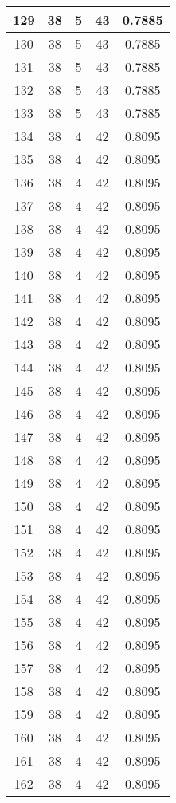 \documentclass[letterpaper, 12pt]{article}
\begin{document}
\begin{longtable}{|c|c|c|c|c|}
\hline
129 & 38 & 5 & 43 & 0.7885 \\
\hline
130 & 38 & 5 & 43 & 0.7885 \\
\hline
131 & 38 & 5 & 43 & 0.7885 \\
\hline
132 & 38 & 5 & 43 & 0.7885 \\
\hline
133 & 38 & 5 & 43 & 0.7885 \\
\hline
134 & 38 & 4 & 42 & 0.8095 \\
\hline
135 & 38 & 4 & 42 & 0.8095 \\
\hline
136 & 38 & 4 & 42 & 0.8095 \\
\hline
137 & 38 & 4 & 42 & 0.8095 \\
\hline
138 & 38 & 4 & 42 & 0.8095 \\
\hline
139 & 38 & 4 & 42 & 0.8095 \\
\hline
140 & 38 & 4 & 42 & 0.8095 \\
\hline
141 & 38 & 4 & 42 & 0.8095 \\
\hline
142 & 38 & 4 & 42 & 0.8095 \\
\hline
143 & 38 & 4 & 42 & 0.8095 \\
\hline
144 & 38 & 4 & 42 & 0.8095 \\
\hline
145 & 38 & 4 & 42 & 0.8095 \\
\hline
146 & 38 & 4 & 42 & 0.8095 \\
\hline
147 & 38 & 4 & 42 & 0.8095 \\
\hline
148 & 38 & 4 & 42 & 0.8095 \\
\hline
149 & 38 & 4 & 42 & 0.8095 \\
\hline
150 & 38 & 4 & 42 & 0.8095 \\
\hline
151 & 38 & 4 & 42 & 0.8095 \\
\hline
152 & 38 & 4 & 42 & 0.8095 \\
\hline
153 & 38 & 4 & 42 & 0.8095 \\
\hline
154 & 38 & 4 & 42 & 0.8095 \\
\hline
155 & 38 & 4 & 42 & 0.8095 \\
\hline
156 & 38 & 4 & 42 & 0.8095 \\
\hline
157 & 38 & 4 & 42 & 0.8095 \\
\hline
158 & 38 & 4 & 42 & 0.8095 \\
\hline
159 & 38 & 4 & 42 & 0.8095 \\
\hline
160 & 38 & 4 & 42 & 0.8095 \\
\hline
161 & 38 & 4 & 42 & 0.8095 \\
\hline
162 & 38 & 4 & 42 & 0.8095 \\

\end{longtable}
\end{document}
